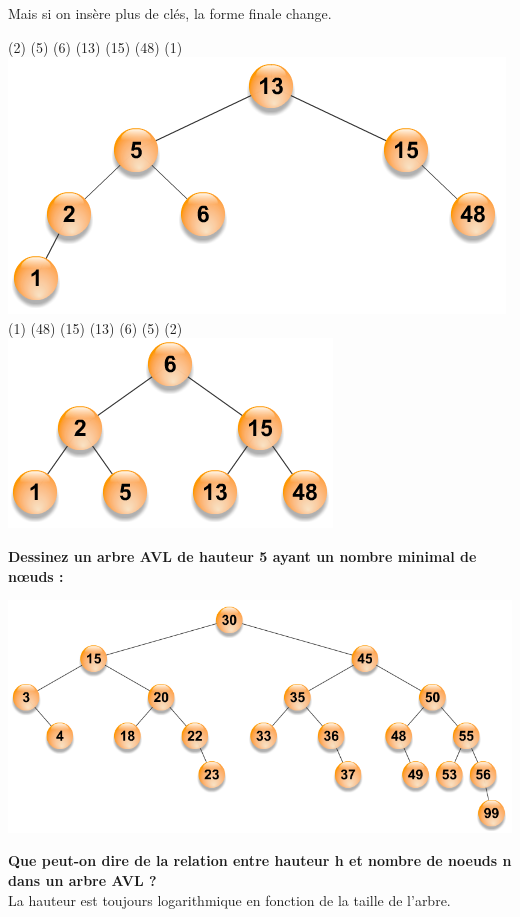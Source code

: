 \documentclass[a4paper]{article}
\begin{document}
Mais si on insère plus de clés, la forme finale change.\\
\begin{center}
(2) (5) (6) (13) (15) (48) (1)\\
\includegraphics{tree2}\\
(1) (48) (15) (13) (6) (5) (2)\\
\includegraphics{tree3}
\end{center}
\newpage
\textbf{Dessinez un arbre AVL de hauteur 5 ayant un nombre minimal de nœuds :}\\
\begin{center}
\includegraphics[scale=0.8]{tree4}
\end{center}
\textbf{Que peut-on dire de la relation entre hauteur h et nombre de noeuds n dans un arbre AVL ?}\\
La hauteur est toujours logarithmique en fonction de la taille de l’arbre.
\end{document}
